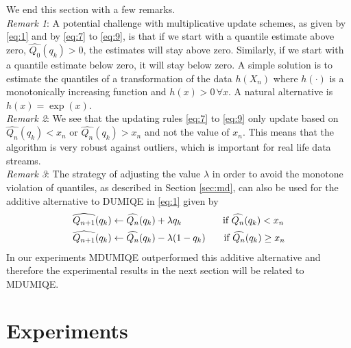 \documentclass[10pt, a4paper]{article}
\newtheorem{rational for conjecture}{Rational for Conjecture}
\begin{document}
We end this section with a few remarks.\\[0mm]
\textit{Remark 1}: A potential challenge with multiplicative update schemes, as given by \eqref{eq:1} and by \eqref{eq:7} to \eqref{eq:9}, is that if we start with a quantile estimate above zero, $\widehat{Q_{0}}(q_k) > 0$, the estimates will stay above zero. Similarly, if we start with a quantile estimate below zero, it will stay below zero. A simple solution is to estimate the quantiles of a transformation of the data $h(X_n)$ where $h(\cdot)$ is a monotonically increasing function and $h(x)>0\, \forall x$. A natural alternative is $h(x) = \exp(x)$.\\[1mm]
\textit{Remark 2}: We see that the updating rules \eqref{eq:7} to \eqref{eq:9} only update based on $\widehat{Q_{n}}(q_k) < x_n$ or $\widehat{Q_{n}}(q_k) > x_n$ and not the value of $x_n$. This means that the algorithm is very robust against outliers, which is important for real life data streams.\\[1mm]
\textit{Remark 3}: The strategy of adjusting the value $\lambda$ in order to avoid the monotone violation of quantiles, as described in Section \ref{sec:md}, can also be used for the additive alternative to DUMIQE in \eqref{eq:1} given by
 \begin{align}
\label{eq:1a}
  \begin{split}
   \widehat{Q_{n+1}}(q_k) &\leftarrow \widehat{Q_{n}}(q_k) + \lambda q_k   \hspace{14mm}\text{ if } \widehat{Q_{n}}(q_k) < x_n \\
   \widehat{Q_{n+1}}(q_k) &\leftarrow \widehat{Q_{n}}(q_k) - \lambda (1-q_k)  \,\hspace{5mm}\text{ if } \widehat{Q_{n}}(q_k) \geq x_n
  \end{split}
\end{align}
In our experiments MDUMIQE outperformed this additive alternative and therefore the experimental results in the next section will be related to MDUMIQE.

\section{Experiments}
\label{sec:exper}
\end{document}
